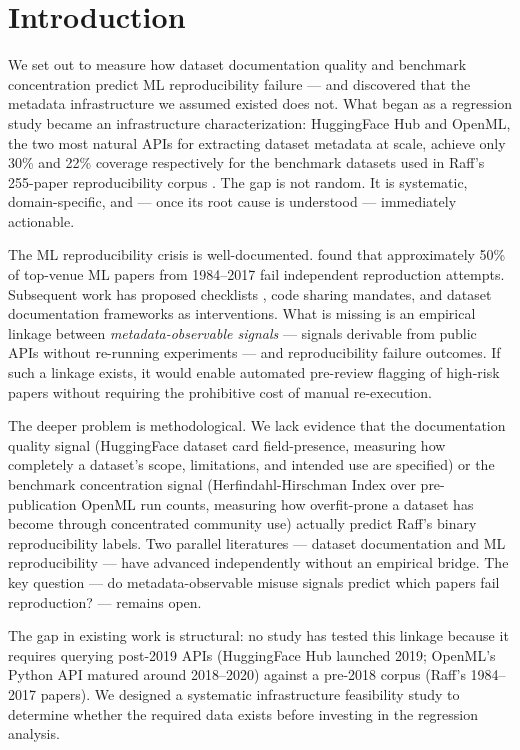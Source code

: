 \section{Introduction}

We set out to measure how dataset documentation quality and benchmark concentration predict ML reproducibility failure --- and discovered that the metadata infrastructure we assumed existed does not. What began as a regression study became an infrastructure characterization: HuggingFace Hub and OpenML, the two most natural APIs for extracting dataset metadata at scale, achieve only 30\% and 22\% coverage respectively for the benchmark datasets used in Raff's 255-paper reproducibility corpus \citep{Raff2019Step}. The gap is not random. It is systematic, domain-specific, and --- once its root cause is understood --- immediately actionable.

The ML reproducibility crisis is well-documented. \citet{Raff2019Step} found that approximately 50\% of top-venue ML papers from 1984--2017 fail independent reproduction attempts. Subsequent work has proposed checklists \citep{Pineau2021Improving}, code sharing mandates, and dataset documentation frameworks \citep{Gebru2021Datasheets} as interventions. What is missing is an empirical linkage between \emph{metadata-observable signals} --- signals derivable from public APIs without re-running experiments --- and reproducibility failure outcomes. If such a linkage exists, it would enable automated pre-review flagging of high-risk papers without requiring the prohibitive cost of manual re-execution.

The deeper problem is methodological. We lack evidence that the documentation quality signal (HuggingFace dataset card field-presence, measuring how completely a dataset's scope, limitations, and intended use are specified) or the benchmark concentration signal (Herfindahl-Hirschman Index over pre-publication OpenML run counts, measuring how overfit-prone a dataset has become through concentrated community use) actually predict Raff's binary reproducibility labels. Two parallel literatures --- dataset documentation \citep{Gebru2021Datasheets, Bender2021Dangers} and ML reproducibility \citep{Raff2019Step, Pineau2021Improving} --- have advanced independently without an empirical bridge. The key question --- do metadata-observable misuse signals predict which papers fail reproduction? --- remains open.

The gap in existing work is structural: no study has tested this linkage because it requires querying post-2019 APIs (HuggingFace Hub launched 2019; OpenML's Python API matured around 2018--2020) against a pre-2018 corpus (Raff's 1984--2017 papers). We designed a systematic infrastructure feasibility study to determine whether the required data exists before investing in the regression analysis.

